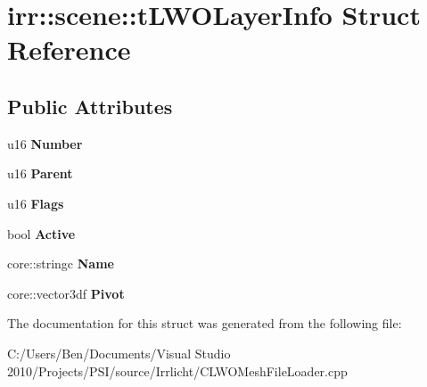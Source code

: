 \hypertarget{structirr_1_1scene_1_1t_l_w_o_layer_info}{\section{irr\-:\-:scene\-:\-:t\-L\-W\-O\-Layer\-Info Struct Reference}
\label{structirr_1_1scene_1_1t_l_w_o_layer_info}
}
\subsection*{Public Attributes}
\begin{DoxyCompactItemize}
\item 
\hypertarget{structirr_1_1scene_1_1t_l_w_o_layer_info_abd6d44355c90d796405347326b48bd28}{u16 {\bfseries Number}}\label{structirr_1_1scene_1_1t_l_w_o_layer_info_abd6d44355c90d796405347326b48bd28}

\item 
\hypertarget{structirr_1_1scene_1_1t_l_w_o_layer_info_a9695608baa5ed2ec349933249ad72972}{u16 {\bfseries Parent}}\label{structirr_1_1scene_1_1t_l_w_o_layer_info_a9695608baa5ed2ec349933249ad72972}

\item 
\hypertarget{structirr_1_1scene_1_1t_l_w_o_layer_info_a3b865839fcb64d9c38c541e35a3145bc}{u16 {\bfseries Flags}}\label{structirr_1_1scene_1_1t_l_w_o_layer_info_a3b865839fcb64d9c38c541e35a3145bc}

\item 
\hypertarget{structirr_1_1scene_1_1t_l_w_o_layer_info_a02fc13a07ae2a395b2b8ebeb222c2388}{bool {\bfseries Active}}\label{structirr_1_1scene_1_1t_l_w_o_layer_info_a02fc13a07ae2a395b2b8ebeb222c2388}

\item 
\hypertarget{structirr_1_1scene_1_1t_l_w_o_layer_info_a08b705d324a946b688c84667b6ff6384}{core\-::stringc {\bfseries Name}}\label{structirr_1_1scene_1_1t_l_w_o_layer_info_a08b705d324a946b688c84667b6ff6384}

\item 
\hypertarget{structirr_1_1scene_1_1t_l_w_o_layer_info_a0bf11e80dff07878fd60a2ce9b84668f}{core\-::vector3df {\bfseries Pivot}}\label{structirr_1_1scene_1_1t_l_w_o_layer_info_a0bf11e80dff07878fd60a2ce9b84668f}

\end{DoxyCompactItemize}


The documentation for this struct was generated from the following file\-:\begin{DoxyCompactItemize}
\item 
C\-:/\-Users/\-Ben/\-Documents/\-Visual Studio 2010/\-Projects/\-P\-S\-I/source/\-Irrlicht/C\-L\-W\-O\-Mesh\-File\-Loader.\-cpp\end{DoxyCompactItemize}
